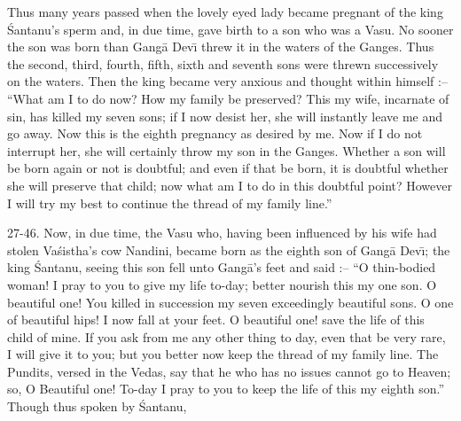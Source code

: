 Thus many years passed when the lovely eyed lady became pregnant of the king \'Santanu's sperm and, in due time, gave birth to a son who was a Vasu. No sooner the son was born than Gang\=a Dev\={\i} threw it in the waters of the Ganges. Thus the second, third, fourth, fifth, sixth and seventh sons were threwn successively on the waters. Then the king became very anxious and thought within himself :-- ``What am I to do now? How my family be preserved? This my wife, incarnate of sin, has killed my seven sons; if I now desist her, she will instantly leave me and go away. Now this is the eighth pregnancy as desired by me. Now if I do not interrupt her, she will certainly throw my son in the Ganges. Whether a son will be born again or not is doubtful; and even if that be born, it is doubtful whether she will preserve that child; now what am I to do in this doubtful point? However I will try my best to continue the thread of my family line.''

27-46. Now, in due time, the Vasu who, having been influenced by his wife had stolen Va\'sistha's cow Nandini, became born as the eighth son of Gang\=a Dev\={\i}; the king \'Santanu, seeing this son fell unto Gang\=a's feet and said :-- ``O thin-bodied woman! I pray to you to give my life to-day; better nourish this my one son. O beautiful one! You killed in succession my seven exceedingly beautiful sons. O one of beautiful hips! I now fall at your feet. O beautiful one! save the life of this child of mine. If you ask from me any other thing to day, even that be very rare, I will give it to you; but you better now keep the thread of my family line. The Pundits, versed in the Vedas, say that he who has no issues cannot go to Heaven; so, O Beautiful one! To-day I pray to you to keep the life of this my eighth son.'' Though thus spoken by \'Santanu,

